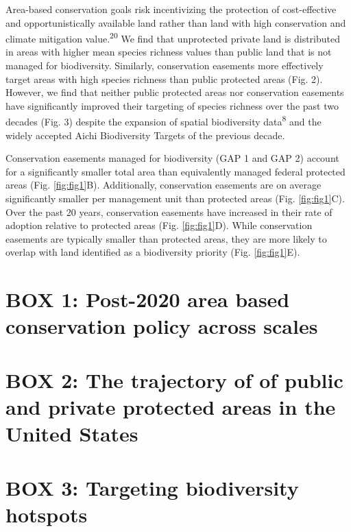 \documentclass[3p]{elsarticle} %
\begin{document}
Area-based conservation goals risk incentivizing the protection of
cost-effective and opportunistically available land rather than land
with high conservation and climate mitigation value.\textsuperscript{20}
We find that unprotected private land is distributed in areas with
higher mean species richness values than public land that is not managed
for biodiversity. Similarly, conservation easements more effectively
target areas with high species richness than public protected areas
(Fig. 2). However, we find that neither public protected areas nor
conservation easements have significantly improved their targeting of
species richness over the past two decades (Fig. 3) despite the
expansion of spatial biodiversity data\textsuperscript{8} and the widely
accepted Aichi Biodiversity Targets of the previous decade.

Conservation easements managed for biodiversity (GAP 1 and GAP 2)
account for a significantly smaller total area than equivalently managed
federal protected areas (Fig. \ref{fig:fig1}B). Additionally,
conservation easements are on average significantly smaller per
management unit than protected areas (Fig. \ref{fig:fig1}C). Over the
past 20 years, conservation easements have increased in their rate of
adoption relative to protected areas (Fig. \ref{fig:fig1}D). While
conservation easements are typically smaller than protected areas, they
are more likely to overlap with land identified as a biodiversity
priority (Fig. \ref{fig:fig1}E).

\hypertarget{box-1-post-2020-area-based-conservation-policy-across-scales}{%
\section{BOX 1: Post-2020 area based conservation policy across
scales}\label{box-1-post-2020-area-based-conservation-policy-across-scales}}

\hypertarget{box-2-the-trajectory-of-of-public-and-private-protected-areas-in-the-united-states}{%
\section{BOX 2: The trajectory of of public and private protected areas
in the United
States}\label{box-2-the-trajectory-of-of-public-and-private-protected-areas-in-the-united-states}}

\hypertarget{box-3-targeting-biodiversity-hotspots}{%
\section{BOX 3: Targeting biodiversity
hotspots}\label{box-3-targeting-biodiversity-hotspots}}
\end{document}
